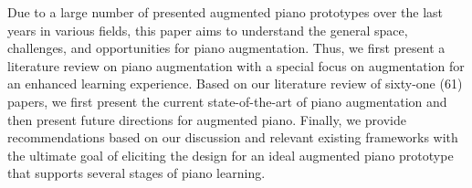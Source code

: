 \documentclass[sigconf, screen, review]{acmart}
\begin{document}
Due to a large number of presented augmented piano prototypes over the last years in various fields, this paper aims to understand the general space, challenges, and opportunities for piano augmentation. Thus, we first present a literature review on piano augmentation with a special focus on augmentation for an enhanced learning experience. Based on our literature review of sixty-one (61) papers, we first present the current state-of-the-art of piano augmentation and then present future directions for augmented piano. Finally, we provide recommendations based on our discussion and relevant existing frameworks with the ultimate goal of eliciting the design for an ideal augmented piano prototype that supports several stages of piano learning.
\end{document}
